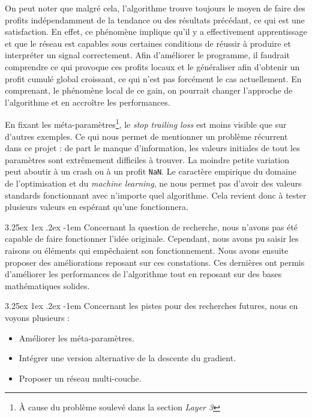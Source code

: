 \documentclass[a4paper, 11pt]{article}
\makeatletter
\renewcommand\paragraph{\@startsection{paragraph}{5}{\z@}%
  {3.25ex \@plus1ex \@minus.2ex}%
  {-1em}%
  {\normalfont\normalsize\bfseries}}
\makeatother
\begin{document}
On peut noter que malgré cela, l'algorithme trouve toujours le moyen de faire des profits indépendamment de la tendance ou des résultats précédant, ce
qui est une satisfaction. En effet, ce phénomène implique qu'il y a effectivement apprentissage et que le réseau est capables sous certaines conditions
de réussir à produire et interpréter un signal correctement. Afin
d'améliorer le programme, il faudrait comprendre ce qui provoque ces profits locaux et le généraliser afin d'obtenir un profit cumulé global croissant, ce qui
n'est pas forcément le cas actuellement. En comprenant, le phénomène local de ce gain, on pourrait changer l'approche de l'algorithme et en accroître les
performances.

En fixant les méta-paramètres\footnote{À cause du problème soulevé dans la section \textit{Layer 3}}, le \textit{stop trailing loss} est moins visible
que sur d'autres exemples. Ce qui nous permet de mentionner un problème récurrent dans ce projet : de part le manque d'information, les valeurs initiales
de tout les paramètres sont extrêmement difficiles à trouver. La moindre petite variation peut aboutir à un crash ou à un profit \texttt{NaN}. Le caractère
empirique du domaine de l'optimisation et du \textit{machine learning}, ne nous permet pas d'avoir des valeurs standards fonctionnant avec n'importe quel
algorithme. Cela revient donc à tester plusieurs valeurs en espérant qu'une fonctionnera.

\paragraph{}
Concernant la question de recherche, nous n'avons pas été capable de faire fonctionner l'idée originale. Cependant, nous avons pu saisir les raisons ou 
éléments qui empêchaient son fonctionnement. Nous avons ensuite proposer des améliorations reposant sur ces constations. Ces dernières ont permis 
d'améliorer les performances de l'algorithme tout en reposant sur des bases mathématiques solides.

\paragraph{}
Concernant les pistes pour des recherches futures, nous en voyons plusieurs :
\begin{itemize}
 \item Améliorer les méta-paramètres.
 \item Intégrer une version alternative de la descente du gradient.
 \item Proposer un réseau multi-couche.
\end{itemize}
\end{document}
